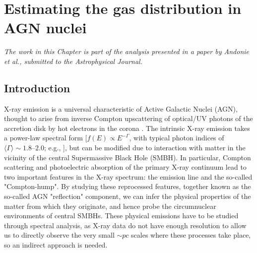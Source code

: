 
\chapter{Estimating the gas distribution in AGN nuclei} \label{ch:gas_distribution}

\begin{center}
  {\it The work in this Chapter is part of the analysis presented in a paper by Andonie et al., submitted to the Astrophysical Journal.}
  \vspace{1cm}
\end{center}


\section{Introduction}
X-ray emission is a universal characteristic of Active Galactic Nuclei (AGN), thought to arise from inverse Compton upscattering of optical/UV photons of the accretion disk by hot electrons in the corona  \citep[e.g.,][]{1991ApJ...380L..51H}. The intrinsic X-ray emission takes a power-law spectral form  [$f(E){\propto}E^{-\Gamma}$, with  typical photon indices of ${\langle}\Gamma{\rangle}{\sim}1.8$--$2.0$; e.g., \citealt{1994MNRAS.268..405N, 2009ApJ...690.1322W, 2011A&A...530A..42C}], but can be modified due to interaction with matter in the vicinity of the central Supermassive Black Hole (SMBH). In particular, Compton scattering and photoelectric absorption of the primary X-ray continuum lead to two important features in the X-ray spectrum: the \kalfa{} emission line and the so-called "Compton-hump". By studying these reprocessed features, together known as the so-called AGN "reflection" component, we can infer the physical properties of the matter from which they originate, and hence probe the circumnuclear environments of central SMBHs. These physical emissions have to be studied through spectral analysis, as X-ray data do not have enough resolution to allow us to directly observe the very small $\sim pc$ scales where these processes take place, so an indirect approach is needed.

